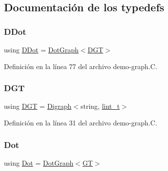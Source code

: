 \subsection{Documentación de los \textquotesingle{}typedefs\textquotesingle{}}
\mbox{\label{demo-graph_8_c_a0ffdd103a7285712ccbd9548ff5544e7}} 
\subsubsection{\texorpdfstring{D\+Dot}{DDot}}
{\footnotesize\ttfamily using \hyperlink{demo-buildgraph_8_c_a0ffdd103a7285712ccbd9548ff5544e7}{D\+Dot} =  \hyperlink{class_designar_1_1_dot_graph}{Dot\+Graph}$<$\hyperlink{demo-buildgraph_8_c_ae73e956c2a8cf0a58255aa6b659985e0}{D\+GT}$>$}



Definición en la línea 77 del archivo demo-\/graph.\+C.

\mbox{\label{demo-graph_8_c_a6b9eddfa4274f215240c1c90be9df2dc}} 
\subsubsection{\texorpdfstring{D\+GT}{DGT}}
{\footnotesize\ttfamily using \hyperlink{demo-buildgraph_8_c_ae73e956c2a8cf0a58255aa6b659985e0}{D\+GT} =  \hyperlink{class_designar_1_1_digraph}{Digraph}$<$string, \hyperlink{namespace_designar_a9d113d66a39e82b73727c72cd3a52f73}{lint\+\_\+t}$>$}



Definición en la línea 31 del archivo demo-\/graph.\+C.

\mbox{\label{demo-graph_8_c_a70657b0b48a4d69ef850be3c5517ecc2}} 
\subsubsection{\texorpdfstring{Dot}{Dot}}
{\footnotesize\ttfamily using \hyperlink{demo-buildgraph_8_c_a70657b0b48a4d69ef850be3c5517ecc2}{Dot} =  \hyperlink{class_designar_1_1_dot_graph}{Dot\+Graph}$<$\hyperlink{demo-buildgraph_8_c_a3001c40d2c31ca87ed96cd7d1334a55e}{GT}$>$}



